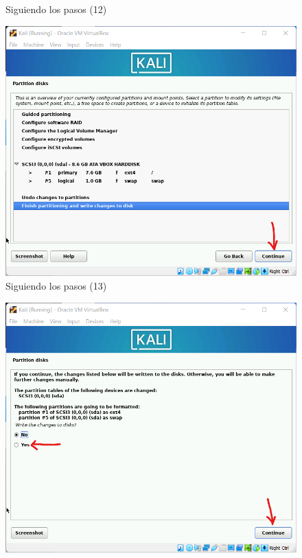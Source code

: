 \documentclass[stu, 12pt, letterpaper, donotrepeattitle, floatsintext, natbib, helv]{apa7}
\begin{document}
\begin{enumerate}
\begin{figure} [H]
        \caption{Siguiendo los pasos (12)}
        \label{fig:Inst12}
    \end{figure}
    \begin{figure} [H]
        \includegraphics[width = 1\textwidth]{Installation13.png}
        \caption{Siguiendo los pasos (13)}
        \label{fig:Inst13}
    \end{figure}
    \begin{figure} [H]
        \includegraphics[width = 1\textwidth]{Installation14.png}

\end{figure}
\end{enumerate}
\end{document}
